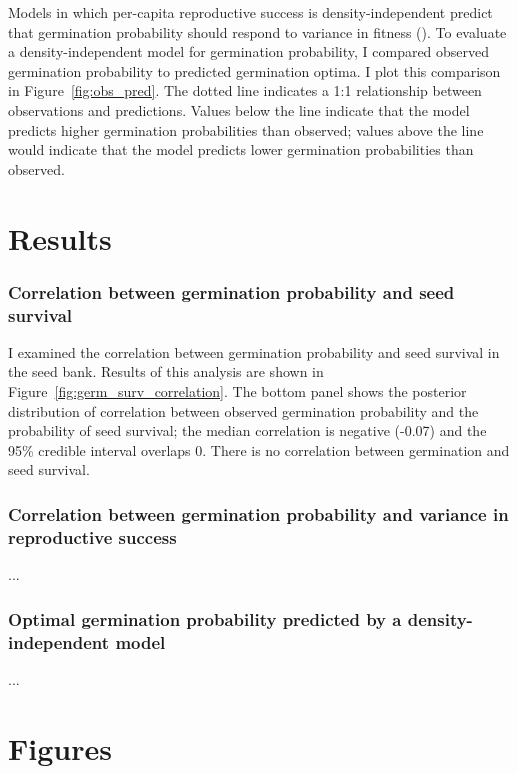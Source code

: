\documentclass[12pt, oneside, titlepage]{article}   	%
\begin{document}
Models in which per-capita reproductive success is density-independent predict that germination probability should respond to variance in fitness (\cite{cohen1966}). To evaluate a density-independent model for germination probability, I compared observed germination probability to predicted germination optima. I plot this comparison in Figure~\ref{fig:obs_pred}. The dotted line indicates a 1:1 relationship between observations and predictions. Values below the line indicate that the model predicts higher germination probabilities than observed; values above the line would indicate that the model predicts lower germination probabilities than observed.

\section*{Results}

\subsubsection*{Correlation between germination probability and seed survival}

I examined the correlation between germination probability and seed survival in the seed bank. Results of this analysis are shown in Figure~\ref{fig:germ_surv_correlation}. The bottom panel shows the posterior distribution of correlation between observed germination probability and the probability of seed survival; the median correlation is negative (-0.07) and the 95\% credible interval overlaps 0. There is no correlation between germination and seed survival.

\subsubsection*{Correlation between germination probability and variance in reproductive success}

...

\subsubsection*{Optimal germination probability predicted by a density-independent model}

...

\newpage
\section*{Figures} 
\end{document}
